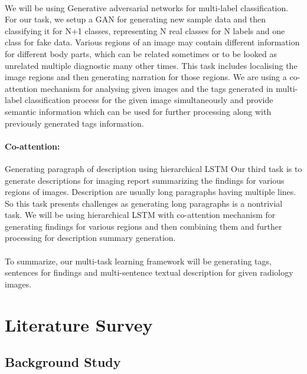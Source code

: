 \documentclass[12pt]{article}
\numberwithin{figure}{section}
\begin{document}
\paragraph{}
We will be using Generative adversarial networks for multi-label classification. For our task, we setup a GAN for generating new sample data and then classifying it for N+1 classes, representing N real classes for N labels and one class for fake data.
Various regions of an image may contain different information for different body parts, which can be related sometimes or to be looked as unrelated multiple diagnostic many other times. This task includes localising the image regions and then generating narration for those regions. We are using a co-attention mechanism for analysing given images and the tags generated in multi-label classification process for the given image simultaneously and provide semantic information which can be used for further processing along with previously generated tags information.
\paragraph{Co-attention:}
Generating paragraph of description using hierarchical LSTM
Our third task is to generate descriptions for imaging report summarizing the findings for various regions of images. Description are usually long paragraphs having multiple lines. So this task presents challenges as generating long paragraphs is a nontrivial task. We will be using hierarchical LSTM\cite{1} with co-attention mechanism for generating findings for various regions and then combining them and further processing for description summary generation.
\paragraph{}
To summarize, our multi-task learning framework  will be generating tags, sentences for findings and multi-sentence textual description for given radiology images.


\clearpage


\section{Literature Survey}
\subsection{Background Study}
\end{document}
